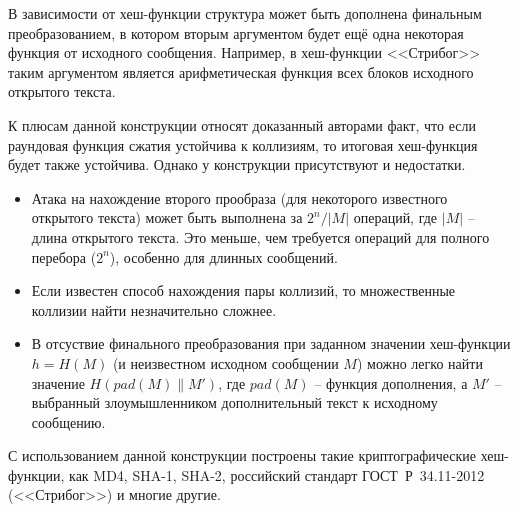 В зависимости от хеш-функции структура может быть дополнена финальным преобразованием, в котором вторым аргументом будет ещё одна некоторая функция от исходного сообщения. Например, в хеш-функции <<Стрибог>> таким аргументом является арифметическая функция всех блоков исходного открытого текста.

К плюсам данной конструкции относят доказанный авторами факт, что если раундовая функция сжатия устойчива к коллизиям, то итоговая хеш-функция будет также устойчива. Однако у конструкции присутствуют и недостатки.

\begin{itemize}
  \item Атака на нахождение второго прообраза (для некоторого известного открытого текста) может быть выполнена за $2^n / | M |$ операций, где $| M |$ -- длина открытого текста. Это меньше, чем требуется операций для полного перебора ($2^n$), особенно для длинных сообщений.
  \item Если известен способ нахождения пары коллизий, то множественные коллизии найти незначительно сложнее.
  \item В отсуствие финального преобразования при заданном значении хеш-функции $h = H(M)$ (и неизвестном исходном сообщении $M$) можно легко найти значение $H( pad(M) \| M' )$, где $pad(M)$ -- функция дополнения, а $M'$ -- выбранный злоумышленником дополнительный текст к исходному сообщению.
\end{itemize}

С использованием данной конструкции построены такие криптографические хеш-функции, как MD4, SHA-1, SHA-2, российский стандарт ГОСТ~Р~34.11-2012 (<<Стрибог>>) и многие другие.

